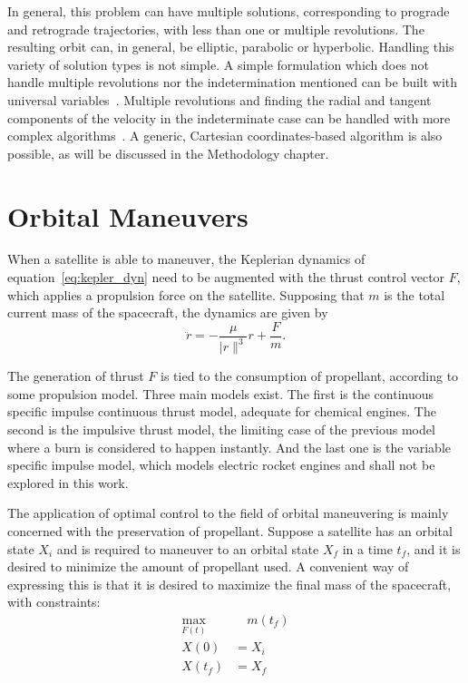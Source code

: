 In general, this problem can have multiple solutions, corresponding to prograde and retrograde trajectories, with less than one or multiple revolutions. The resulting orbit can, in general, be elliptic, parabolic or hyperbolic. Handling this variety of solution types is not simple. A simple formulation which does not handle multiple revolutions nor the indetermination mentioned can be built with universal variables~\cite{curtis2015orbital}. Multiple revolutions and finding the radial and tangent components of the velocity in the indeterminate case can be handled with more complex algorithms~\cite{sukhanov}. A generic, Cartesian coordinates-based algorithm is also possible, as will be discussed in the Methodology chapter.


\section{Orbital Maneuvers}

When a satellite is able to maneuver, the Keplerian dynamics of equation~\eqref{eq:kepler_dyn} need to be augmented with the thrust control vector \(F\), which applies a propulsion force on the satellite. Supposing that \(m\) is the total current mass of the spacecraft, the dynamics are given by
\begin{equation}
    \ddot r = -\frac{\mu}{\lvert r \rVert^3}r + \frac{F}{m}.
\end{equation}

The generation of thrust \(F\) is tied to the consumption of propellant, according to some propulsion model. Three main models exist. The first is the continuous specific impulse continuous thrust model, adequate for chemical engines. The second is the impulsive thrust model, the limiting case of the previous model where a burn is considered to happen instantly. And the last one is the variable specific impulse model, which models electric rocket engines and shall not be explored in this work.

The application of optimal control to the field of orbital maneuvering is mainly concerned with the preservation of propellant. Suppose a satellite has an orbital state \(X_i\) and is required to maneuver to an orbital state \(X_f\) in a time \(t_f\), and it is desired to minimize the amount of propellant used. A convenient way of expressing this is that it is desired to maximize the final mass of the spacecraft, with constraints:
\begin{align}
    \max_{F(t)}&\quad m(t_f) \label{eq:max_final_mass} \\
    X(0) &= X_i \\
    X(t_f) &= X_f
\end{align}

